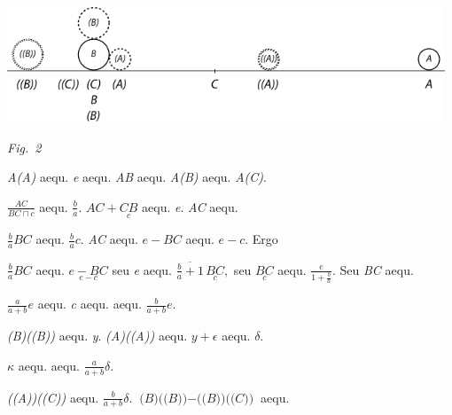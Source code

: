   \centerline{\includegraphics[width=0.98\textwidth]{gesamttex/edit_VIII,3/images/LH_35_09_23_004-005_d2.pdf}}%
  \vspace{0.5em}
  \centerline{\lbrack\textit{Fig.~2}\rbrack}%
  \newpage%
%
%
\pstart%
\noindent%
\textit{A(A)} aequ. \textit{e}
aequ. \textit{AB}
aequ. \textit{A(B)}
aequ. \textit{A(C)}.
\rule[-3mm]{0pt}{0mm}%
%
\quad
$\displaystyle\frac{AC}{BC \sqcap c}$
aequ. $\displaystyle\frac{b}{a}.$
%
$AC + \underset{\displaystyle c}{CB}$ aequ. \textit{e}.
%
\textit{AC} aequ.
\rule[-3mm]{0pt}{9mm}%
$\displaystyle\frac{b}{a}\textit{BC}$
aequ. $\displaystyle\frac{b}{a}c.$
%
\textit{AC} aequ. $e - BC$
aequ. $e - c.$
%
\quad
Ergo \rule[-3mm]{0pt}{9mm}%
$\displaystyle\frac{b}{a}BC$
aequ.
$\displaystyle\underset{\displaystyle e-c}{e-BC}$
seu \textit{e} aequ.
$\overline{\displaystyle\frac{b}{a}+1}\,\underset{\displaystyle c}{BC},$
seu $\underset{\displaystyle c}{BC}$
aequ.
$\displaystyle\frac{e}{1 + \displaystyle\frac{b}{a}}.$
%
Seu \textit{BC} aequ.
\rule[1mm]{0pt}{5,0mm}%
$\displaystyle\frac{a}{a+b}e$
aequ. \textit{c}
aequ.
%
%
aequ. $\displaystyle\frac{b}{a+b}e.$
\rule[-6mm]{0pt}{-6mm}%
\pend%
%
\pstart%
\textit{(B)((B))} aequ. \textit{y}.
\quad
\textit{(A)((A))} aequ.
%
%
\quad
$y + \epsilon$ aequ. $\delta.$%
\rule[-2mm]{0pt}{0mm}
\quad
$\kappa$ aequ.
%
%
aequ. $\displaystyle\frac{a}{a+b}\delta.$
\rule[-1mm]{0pt}{7mm}%
\quad
\textit{((A))((C))} aequ. $\displaystyle\frac{b}{a+b}\delta.$
\quad
%
$\textit{(B)((B))} - \textit{((B))((C))}$ aequ.
